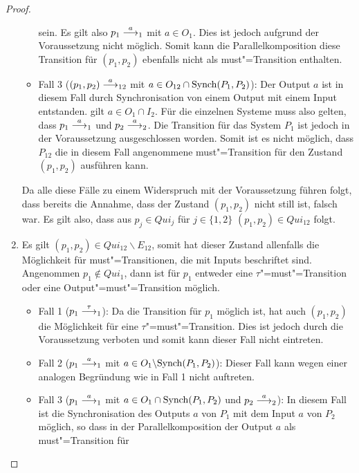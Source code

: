 \begin{proof}
\begin{enumerate}
\begin{itemize}
          sein. Es gilt also \oBdA{} $p_1\must[a]_1$ mit $a\in O_1$. Dies ist
          jedoch aufgrund der Voraussetzung nicht möglich. Somit kann die
          Parallelkomposition diese Transition für $(p_1,p_2)$ ebenfalls nicht
          als must"=Transition enthalten.
        \item Fall 3 \big($(p_1,p_2)\must[a]_{12}$ mit $a\in O_{12}\cap\mathrm{Synch}
          (P_1,P_2)$\big): Der Output $a$ ist in diesem Fall durch
          Synchronisation von einem Output mit einem Input entstanden. \OBdA{}
          gilt $a\in O_1\cap I_2$. Für die einzelnen Systeme muss also gelten,
          dass $p_1\must[a]_1$ und $p_2\must[a]_2$. Die Transition für das
          System $P_1$ ist jedoch in der Voraussetzung ausgeschlossen worden.
          Somit ist es nicht möglich, dass $P_{12}$ die in diesem Fall
          angenommene must"=Transition für den Zustand $(p_1,p_2)$ ausführen
          kann.
      \end{itemize}
      Da alle diese Fälle zu einem Widerspruch mit der Voraussetzung führen
      folgt, dass bereits die Annahme, dass der Zustand $(p_1,p_2)$ nicht still
      ist, falsch war. Es gilt also, dass aus $p_j\in Qui_j$ für $j\in\{1,2\}$
      $(p_1,p_2)\in Qui_{12}$ folgt.
    \item Es gilt $(p_1,p_2)\in Qui_{12}\backslash E_{12}$, somit hat dieser
      Zustand allenfalls die Möglichkeit für must"=Transitionen, die mit Inputs
      beschriftet sind.\\
      Angenommen $p_1\notin Qui _1$, dann ist für $p_1$ entweder eine
      $\tau$"=must"=Transition oder eine Output"=must"=Transition möglich.
      \begin{itemize}
        \item Fall 1 \big($p_1\must[\tau]_1$\big): Da die Transition für $p_1$
          möglich ist, hat auch $(p_1,p_2)$ die Möglichkeit für eine
          $\tau$"=must"=Transition. Dies ist jedoch durch die Voraussetzung
          verboten und somit kann dieser Fall nicht eintreten.
        \item Fall 2 \big($p_1\must[a]_1$ mit $a\in O_1\backslash
          \mathrm{Synch}(P_1,P_2)$\big): Dieser Fall kann wegen einer analogen
          Begründung wie in Fall 1 nicht auftreten.
        \item Fall 3 \big($p_1\must[a]_1$ mit $a\in O_1\cap\mathrm{Synch}(P_1,P_2)$ und
          $p_2\must[a]_2$\big): In diesem Fall ist die Synchronisation des
          Outputs $a$ von $P_1$ mit dem Input $a$ von $P_2$ möglich, so dass in
          der Parallelkomposition der Output $a$ als must"=Transition für

\end{itemize}
\end{enumerate}
\end{proof}

